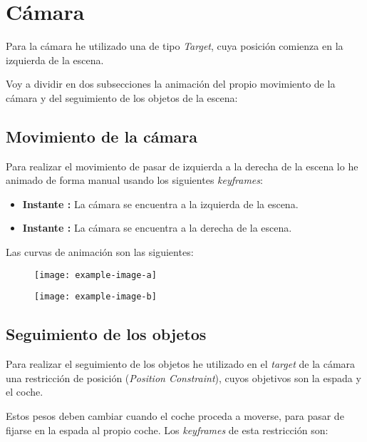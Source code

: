 \section{Cámara}

Para la cámara he utilizado una de tipo \textit{Target}, cuya posición comienza en la izquierda de la escena.

Voy a dividir en dos subsecciones la animación del propio movimiento de la cámara y del seguimiento de los objetos de la escena:

\subsection{Movimiento de la cámara}

Para realizar el movimiento de pasar de izquierda a la derecha de la escena lo he animado de forma manual usando los siguientes \textit{keyframes}:

\begin{itemize}
    \item \textbf{Instante : }La cámara se encuentra a la izquierda de la escena.
    \item \textbf{Instante : }La cámara se encuentra a la derecha de la escena.
\end{itemize}

\bigskip

Las curvas de animación son las siguientes: 

\begin{figure}[H]
    \centering
   \texttt{[image: example-image-a]}
\end{figure}
\begin{figure}[H]
    \centering
   \texttt{[image: example-image-b]}
\end{figure}

\blindtext

\subsection{Seguimiento de los objetos}

Para realizar el seguimiento de los objetos he utilizado en el \textit{target} de la cámara una restricción de posición (\textit{Position Constraint}), cuyos objetivos son la espada y el coche.

\bigskip

Estos pesos deben cambiar cuando el coche proceda a moverse, para pasar de fijarse en la espada al propio coche. Los \textit{keyframes} de esta restricción son:

